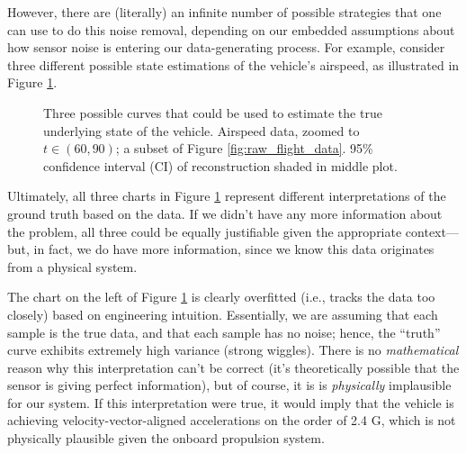 However, there are (literally) an infinite number of possible strategies that one can use to do this noise removal, depending on our embedded assumptions about how sensor noise is entering our data-generating process. For example, consider three different possible state estimations of the vehicle's airspeed, as illustrated in Figure \ref{fig:under_over_fitting}.

\begin{figure}[h]
    \centering
    \caption{Three possible curves that could be used to estimate the true underlying state of the vehicle. Airspeed data, zoomed to $t \in (60, 90)$; a subset of Figure \ref{fig:raw_flight_data}. 95\% confidence interval (CI) of reconstruction shaded in middle plot.}
    \label{fig:under_over_fitting}
\end{figure}

Ultimately, all three charts in Figure \ref{fig:under_over_fitting} represent different interpretations of the ground truth based on the data. If we didn't have any more information about the problem, all three could be equally justifiable given the appropriate context—but, in fact, we do have more information, since we know this data originates from a physical system.

The chart on the left of Figure \ref{fig:under_over_fitting} is clearly overfitted (i.e., tracks the data too closely) based on engineering intuition. Essentially, we are assuming that each sample is the true data, and that each sample has no noise; hence, the ``truth'' curve exhibits extremely high variance (strong wiggles). There is no \emph{mathematical} reason why this interpretation can't be correct (it's theoretically possible that the sensor is giving perfect information), but of course, it is is \emph{physically} implausible for our system. If this interpretation were true, it would imply that the vehicle is achieving velocity-vector-aligned accelerations on the order of 2.4 G, which is not physically plausible given the onboard propulsion system.

